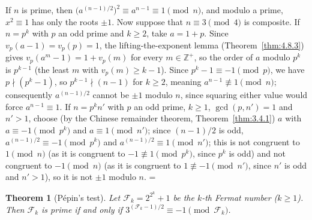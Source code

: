 \documentclass[11pt]{article}
\makeatletter
\theoremstyle{ntstyle}
\newtheorem{theorem}{Theorem}[subsection]
\let\nt@closedisplay\]
\def\nt@guardedclose{\@ifnextchar\par{\nt@closeafterpar}{\@ifnextchar\end{\postdisplaypenalty\@M\nt@closedisplay}{\nt@closedisplay}}}
\def\nt@closeafterpar\par{\@ifnextchar\par{\nt@closeafterpar}{\@ifnextchar\end{\postdisplaypenalty\@M\nt@closedisplay\par}{\nt@closedisplay\par}}}
\renewenvironment{proof}[1][\proofname]{\par
  \pushQED{\qed}\normalfont\topsep\medskipamount\edef\nt@afterproof{\@endparpenalty=\the\@endparpenalty\relax}\@beginparpenalty\@M\@endparpenalty\@M\let\]\nt@guardedclose\trivlist\item[]\textit{#1\@addpunct{.}} \ignorespaces}{\ifvmode\addpenalty\@M\fi\popQED\nt@afterproof\endtrivlist\@endpefalse}
\makeatother
\begin{document}
\begin{proof} If $n$ is prime, then
	$\big(a^{(n-1)/2}\big)^{2}\equiv a^{n-1}\equiv1\pmod{n}$, and modulo a
	prime, $x^{2}\equiv1$ has only the roots $\pm1$. Now suppose that $n\equiv3\pmod{4}$ is
	composite. If $n=p^{k}$ with $p$ an odd prime and $k\ge2$, take $a=1+p$. Since
	$v_p(a-1)=v_p(p)=1$, the lifting-the-exponent lemma (Theorem~\ref{thm:4.8.3}) gives
	$v_p(a^{m}-1)=1+v_p(m)$ for every $m\in\mathbb{Z}^+$, so the order
	of $a$ modulo $p^{k}$ is $p^{k-1}$ (the least $m$ with $v_p(m)\ge
		k-1$). Since $p^{k}-1\equiv-1\pmod{p}$, we have $p\nmid(p^{k}-1)$, so
	$p^{k-1}\nmid(n-1)$ for $k\ge2$, meaning
	$a^{n-1}\not\equiv1\pmod{n}$; consequently $a^{(n-1)/2}$ cannot
	be $\pm1$ modulo $n$, since squaring either value would force
	$a^{n-1}\equiv1$. If $n=p^{k}n'$ with $p$ an odd prime, $k\ge1$, $\gcd(p, n')=1$ and $n'>1$, choose
	(by the Chinese remainder theorem, Theorem~\ref{thm:3.4.1})
	$a$ with $a\equiv-1\pmod{p^{k}}$ and $a\equiv1\pmod{n'}$; since
	$(n-1)/2$ is odd, $a^{(n-1)/2}\equiv-1\pmod{p^{k}}$ and
	$a^{(n-1)/2}\equiv1\pmod{n'}$; this is not congruent to $1\pmod{n}$ (as it is
	congruent to $-1\not\equiv1\pmod{p^{k}}$, since $p^k$ is odd) and not
	congruent to $-1\pmod{n}$ (as it is congruent to $1\not\equiv-1\pmod{n'}$, since
	$n'$ is odd and $n'>1$), so it is not $\pm1$ modulo $n$.
\end{proof}
\begin{theorem}[P{\'e}pin's test]\label{thm:9.1.2} Let
	$\mathcal{F}_k=2^{2^{k}}+1$ be the $k$-th Fermat number ($k\ge1$). Then $\mathcal{F}_k$
	is prime if and only if $3^{(\mathcal{F}_k-1)/2}\equiv-1\pmod{\mathcal{F}_k}$.
\end{theorem}
\end{document}
